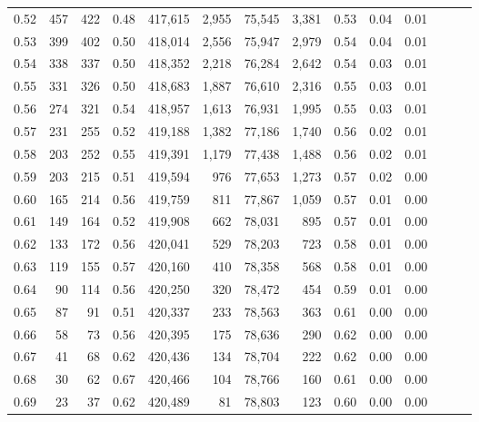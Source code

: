 \begin{tabular}{rrrrrrrrrrrrrr}
0.52 &     457 &    422 &  0.48 &  417,615 &    2,955 &  75,545 &   3,381 &  0.53 &  0.04 &      0.01 \\
0.53 &     399 &    402 &  0.50 &  418,014 &    2,556 &  75,947 &   2,979 &  0.54 &  0.04 &      0.01 \\
0.54 &     338 &    337 &  0.50 &  418,352 &    2,218 &  76,284 &   2,642 &  0.54 &  0.03 &      0.01 \\
0.55 &     331 &    326 &  0.50 &  418,683 &    1,887 &  76,610 &   2,316 &  0.55 &  0.03 &      0.01 \\
0.56 &     274 &    321 &  0.54 &  418,957 &    1,613 &  76,931 &   1,995 &  0.55 &  0.03 &      0.01 \\
0.57 &     231 &    255 &  0.52 &  419,188 &    1,382 &  77,186 &   1,740 &  0.56 &  0.02 &      0.01 \\
0.58 &     203 &    252 &  0.55 &  419,391 &    1,179 &  77,438 &   1,488 &  0.56 &  0.02 &      0.01 \\
0.59 &     203 &    215 &  0.51 &  419,594 &      976 &  77,653 &   1,273 &  0.57 &  0.02 &      0.00 \\
0.60 &     165 &    214 &  0.56 &  419,759 &      811 &  77,867 &   1,059 &  0.57 &  0.01 &      0.00 \\
0.61 &     149 &    164 &  0.52 &  419,908 &      662 &  78,031 &     895 &  0.57 &  0.01 &      0.00 \\
0.62 &     133 &    172 &  0.56 &  420,041 &      529 &  78,203 &     723 &  0.58 &  0.01 &      0.00 \\
0.63 &     119 &    155 &  0.57 &  420,160 &      410 &  78,358 &     568 &  0.58 &  0.01 &      0.00 \\
0.64 &      90 &    114 &  0.56 &  420,250 &      320 &  78,472 &     454 &  0.59 &  0.01 &      0.00 \\
0.65 &      87 &     91 &  0.51 &  420,337 &      233 &  78,563 &     363 &  0.61 &  0.00 &      0.00 \\
0.66 &      58 &     73 &  0.56 &  420,395 &      175 &  78,636 &     290 &  0.62 &  0.00 &      0.00 \\
0.67 &      41 &     68 &  0.62 &  420,436 &      134 &  78,704 &     222 &  0.62 &  0.00 &      0.00 \\
0.68 &      30 &     62 &  0.67 &  420,466 &      104 &  78,766 &     160 &  0.61 &  0.00 &      0.00 \\
0.69 &      23 &     37 &  0.62 &  420,489 &       81 &  78,803 &     123 &  0.60 &  0.00 &      0.00 \\

\end{tabular}
